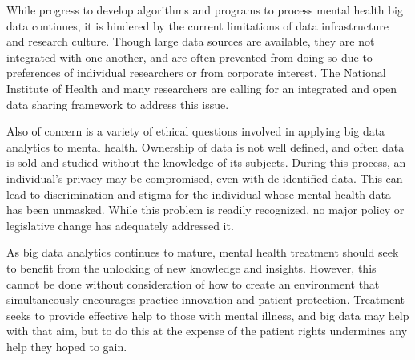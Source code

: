 \documentclass[sigconf]{acmart}
\begin{document}
While progress to develop algorithms and programs to process mental health big data continues, it is hindered by the current limitations of data infrastructure and research culture. Though large data sources are available, they are not integrated with one another, and are often prevented from doing so due to preferences of individual researchers or from corporate interest. The National Institute of Health and many researchers are calling for an integrated and open data sharing framework to address this issue.

Also of concern is a variety of ethical questions involved in applying big data analytics to mental health. Ownership of data is not well defined, and often data is sold and studied without the knowledge of its subjects. During this process, an individual's privacy may be compromised, even with de-identified data. This can lead to discrimination and stigma for the individual whose mental health data has been unmasked. While this problem is readily recognized, no major policy or legislative change has adequately addressed it. 

As big data analytics continues to mature, mental health treatment should seek to benefit from the unlocking of new knowledge and insights. However, this cannot be done without consideration of how to create an environment that simultaneously encourages practice innovation and patient protection. Treatment seeks to provide effective help to those with mental illness, and big data may help with that aim, but to do this at the expense of the patient rights undermines any help they hoped to gain.



\begin{acks}

\end{acks}


 
\end{document}
